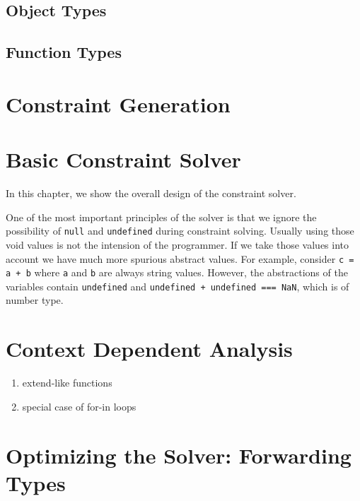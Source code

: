 \documentclass{report}
\begin{document}
\section{Object Types}


\section{Function Types}


\chapter{Constraint Generation}

\chapter{Basic Constraint Solver}

In this chapter, we show the overall design of the constraint solver. 

One of the most important principles of the solver is that 
we ignore the possibility of \texttt{null} and \texttt{undefined} 
during constraint solving.
Usually using those void values is not the intension of the programmer.
If we take those values into account 
we have much more spurious abstract values.
For example, consider \texttt{c = a + b} where \texttt{a} and \texttt{b} 
are always string values. 
However, the abstractions of the variables contain \texttt{undefined} and
\texttt{undefined + undefined === NaN}, which is of number type. 


\chapter{Context Dependent Analysis}
\begin{enumerate}
\item extend-like functions
\item special case of for-in loops
\end{enumerate}

\chapter{Optimizing the Solver: Forwarding Types}
\end{document}
